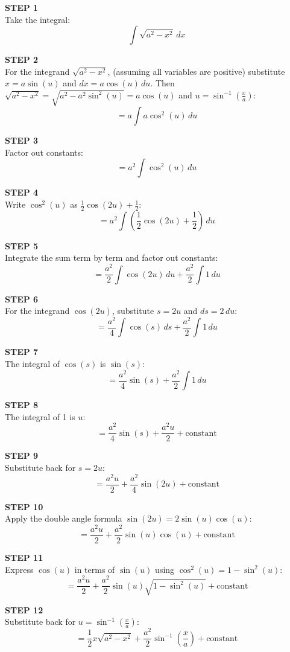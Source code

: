 \textbf{STEP 1} \\
Take the integral:
\[ \int \sqrt{a^2 - x^2} \, dx \]

\textbf{STEP 2} \\
For the integrand \( \sqrt{a^2 - x^2} \), (assuming all variables are positive) substitute \( x = a \sin(u) \) and \( dx = a \cos(u) \, du \). Then \( \sqrt{a^2 - x^2} = \sqrt{a^2 - a^2 \sin^2(u)} = a \cos(u) \) and \( u = \sin^{-1}\left(\frac{x}{a}\right) \):
\[ = a \int a \cos^2(u) \, du \]

\textbf{STEP 3} \\
Factor out constants:
\[ = a^2 \int \cos^2(u) \, du \]

\textbf{STEP 4} \\
Write \( \cos^2(u) \) as \( \frac{1}{2} \cos(2 u) + \frac{1}{2} \):
\[ = a^2 \int \left(\frac{1}{2} \cos(2 u) + \frac{1}{2}\right) \, du \]

\textbf{STEP 5} \\
Integrate the sum term by term and factor out constants:
\[ = \frac{a^2}{2} \int \cos(2 u) \, du + \frac{a^2}{2} \int 1 \, du \]

\textbf{STEP 6} \\
For the integrand \( \cos(2 u) \), substitute \( s = 2 u \) and \( ds = 2 \, du \):
\[ = \frac{a^2}{4} \int \cos(s) \, ds + \frac{a^2}{2} \int 1 \, du \]

\textbf{STEP 7} \\
The integral of \( \cos(s) \) is \( \sin(s) \):
\[ = \frac{a^2}{4} \sin(s) + \frac{a^2}{2} \int 1 \, du \]

\textbf{STEP 8} \\
The integral of 1 is \( u \):
\[ = \frac{a^2}{4} \sin(s) + \frac{a^2 u}{2} + \text{constant} \]

\textbf{STEP 9} \\
Substitute back for \( s = 2 u \):
\[ = \frac{a^2 u}{2} + \frac{a^2}{4} \sin(2 u) + \text{constant} \]

\textbf{STEP 10} \\
Apply the double angle formula \( \sin(2 u) = 2 \sin(u) \cos(u) \):
\[ = \frac{a^2 u}{2} + \frac{a^2}{2} \sin(u) \cos(u) + \text{constant} \]

\textbf{STEP 11} \\
Express \( \cos(u) \) in terms of \( \sin(u) \) using \( \cos^2(u) = 1 - \sin^2(u) \):
\[ = \frac{a^2 u}{2} + \frac{a^2}{2} \sin(u) \sqrt{1 - \sin^2(u)} + \text{constant} \]

\textbf{STEP 12} \\
Substitute back for \( u = \sin^{-1}\left(\frac{x}{a}\right) \):
\[ = \frac{1}{2} x \sqrt{a^2 - x^2} + \frac{a^2}{2} \sin^{-1}\left(\frac{x}{a}\right) + \text{constant} \]

